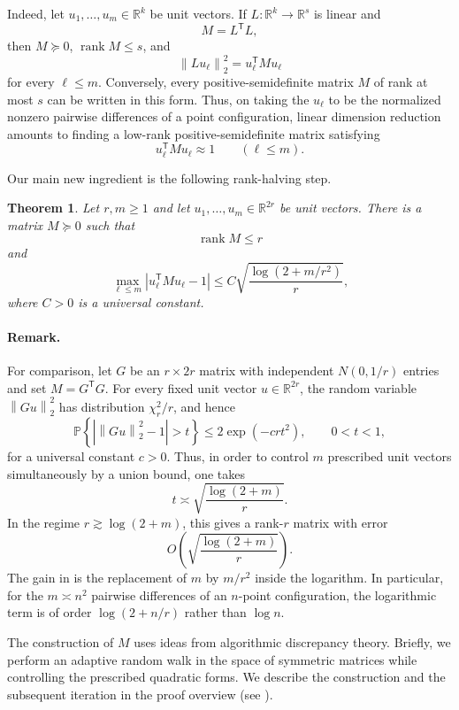 \documentclass[11pt,reqno,letterpaper]{amsart}
\newtheorem{theorem}{Theorem}[section]
\newcommand{\R}{\mathbb R}
\newcommand{\Prob}{\mathbb P}
\newcommand{\rank}{\operatorname{rank}}
\newcommand{\norm}[1]{\left\lVert #1\right\rVert_2}
\newcommand{\abs}[1]{\left\lvert #1\right\rvert}
\begin{document}
Indeed, let $u_1,\ldots,u_m\in\R^k$ be unit vectors. If
$L:\R^k\to\R^s$ is linear and
\[
 M=L^{\mathsf T}L,
\]
then $M\succeq0$, $\rank M\leq s$, and
\[
 \norm{Lu_\ell}^2=u_\ell^{\mathsf T}Mu_\ell
\]
for every $\ell\leq m$. Conversely, every positive-semidefinite matrix
$M$ of rank at most $s$ can be written in this form. Thus, on taking
the $u_\ell$ to be the normalized nonzero pairwise differences of a
point configuration, linear dimension reduction amounts to finding a
low-rank positive-semidefinite matrix satisfying
\[
 u_\ell^{\mathsf T}Mu_\ell\approx1
 \qquad (\ell\leq m).
\]

Our main new ingredient is the following rank-halving step.

\begin{theorem}
\label{thm:psd}
Let $r,m\geq1$ and let $u_1,\ldots,u_m\in\R^{2r}$ be unit vectors. There is
a matrix $M\succeq0$ such that
\[
 \rank M\leq r
\]
and
\[
 \max_{\ell\leq m}
 \abs{u_\ell^{\mathsf T}Mu_\ell-1}
 \leq
 C\sqrt{\frac{\log(2+m/r^2)}{r}},
\]
where $C>0$ is a universal constant.
\end{theorem}

\paragraph{\bf Remark.}
For comparison, let $G$ be an $r\times 2r$ matrix with independent
$N(0,1/r)$ entries and set $M=G^{\mathsf T}G$. For every fixed unit
vector $u\in\R^{2r}$, the random variable $\norm{Gu}^2$ has distribution
$\chi_r^2/r$, and hence
\[
 \Prob\left\{
 \abs{\norm{Gu}^2-1}>t
 \right\}
 \leq
 2\exp(-crt^2),
 \qquad 0<t<1,
\]
for a universal constant $c>0$. Thus, in order to control $m$
prescribed unit vectors simultaneously by a union bound, one takes
\[
 t\asymp
 \sqrt{\frac{\log(2+m)}{r}}.
\]
In the regime $r\gtrsim\log(2+m)$, this gives a rank-$r$ matrix with error
\[
 O\left(\sqrt{\frac{\log(2+m)}{r}}\right).
\]
The gain in  is the replacement of $m$ by $m/r^2$ inside
the logarithm. In particular, for the $m\asymp n^2$ pairwise differences
of an $n$-point configuration, the logarithmic term is of order
$\log(2+n/r)$ rather than $\log n$. 

\medskip

The construction of $M$ uses ideas from algorithmic discrepancy theory. Briefly, we perform an adaptive random walk in the space of symmetric matrices
while controlling the prescribed quadratic forms. We describe the
construction and the subsequent iteration in the proof overview (see ).
\end{document}
